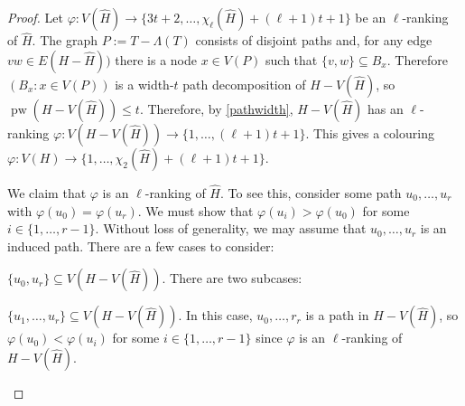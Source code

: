 \documentclass[kpfonts]{patmorin}
\DeclareMathOperator{\pw}{pw}
\newcommand{\trn}{\chi_2}
\newcommand{\lrn}{\chi_{\ell}}
\theoremstyle{named}
\begin{document}
\begin{proof}
    Let $\varphi:V(\hat{H})\to \{3t+2,\ldots,\lrn(\hat{H})+(\ell+1)t+1\}$ be an $\ell$-ranking of $\hat{H}$. The graph $P:=T-\Lambda(T)$ consists of disjoint paths and, for any edge $vw\in E(H-\hat{H}))$ there is a node $x\in V(P)$ such that $\{v,w\}\subseteq B_x$.  Therefore $(B_x:x\in V(P))$ is a width-$t$ path decomposition of $H-V(\hat{H})$, so $\pw(H-V(\hat{H}))\le t$.  Therefore, by \cref{pathwidth}, $H-V(\hat{H})$ has an $\ell$-ranking $\varphi:V(H-V(\hat{H}))\to\{1,\ldots,(\ell+1)t+1\}$.  This gives a colouring $\varphi: V(H)\to\{1,\ldots,\trn(\hat{H})+(\ell+1)t+1\}$.

    We claim that $\varphi$ is an $\ell$-ranking of $\hat{H}$.  To see this, consider some path $u_0,\ldots,u_r$ with $\varphi(u_0)=\varphi(u_r)$.  We must show that $\varphi(u_i)>\varphi(u_0)$ for some $i\in\{1,\ldots,r-1\}$.
    Without loss of generality, we may assume that $u_0,\ldots,u_r$ is an induced path. There are a few cases to consider:
    \begin{compactenum}
        \item $\{u_0,u_r\}\subseteq V(H-V(\hat{H}))$. There are two subcases:
        \begin{compactenum}
            \item $\{u_1,\ldots,u_r\}\subseteq V(H-V(\hat{H}))$.  In this case, $u_0,\ldots,r_r$ is a path in $H-V(\hat{H})$, so  $\varphi(u_0)<\varphi(u_i)$ for some $i\in\{1,\ldots,r-1\}$ since $\varphi$ is an $\ell$-ranking of $H-V(\hat{H})$.


\end{compactenum}
\end{compactenum}
\end{proof}
\end{document}
